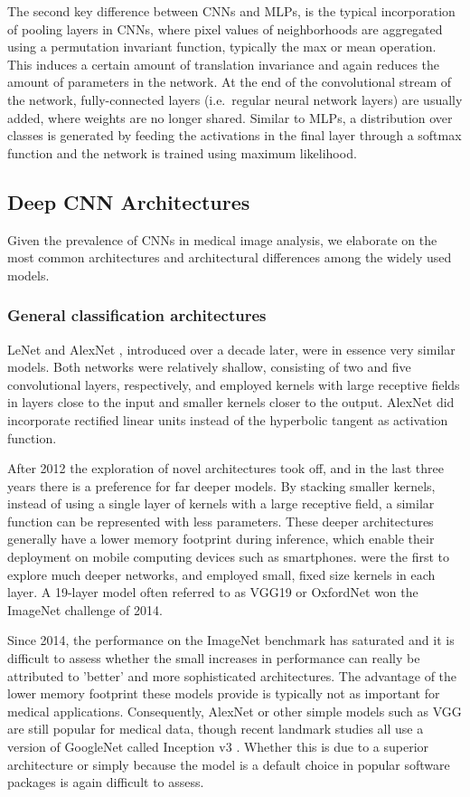 The second key difference between CNNs and MLPs, is the typical incorporation of pooling layers in CNNs, where pixel values of neighborhoods are aggregated using a permutation invariant function, typically the max or mean operation. This induces a certain amount of translation invariance and again reduces the amount of parameters in the network. At the end of the convolutional stream of the network, fully-connected layers (i.e.\ regular neural network layers) are usually added, where weights are no longer shared. Similar to MLPs, a distribution over classes is generated by feeding the activations in the final layer through a softmax function and the network is trained using maximum likelihood. 

\subsection{Deep CNN Architectures}
Given the prevalence of CNNs in medical image analysis, we elaborate on the most common architectures and architectural differences among the widely used models. 

\subsubsection{General classification architectures}
LeNet \cite{Lecu98} and AlexNet \cite{Kriz12}, introduced over a decade later, were in essence very similar models. Both networks were relatively shallow, consisting of two and five convolutional layers, respectively, and employed kernels with large receptive fields in layers close to the input and smaller kernels closer to the output. AlexNet did incorporate rectified linear units instead of the hyperbolic tangent as activation function.

After 2012 the exploration of novel architectures took off, and in the last three years there is a preference for far deeper models. By stacking smaller kernels, instead of using a single layer of kernels with a large receptive field, a similar function can be represented with less parameters. These deeper architectures generally have a lower memory footprint during inference, which enable their deployment on mobile computing devices such as smartphones. \cite{Simo14} were the first to explore much deeper networks, and employed small, fixed size kernels in each layer. A 19-layer model often referred to as VGG19 or OxfordNet won the ImageNet challenge of 2014. 

Since 2014, the performance on the ImageNet benchmark has saturated and it is difficult to assess whether the small increases in performance can really be attributed to 'better' and more sophisticated architectures. The advantage of the lower memory footprint these models provide is typically not as important for medical applications. Consequently, AlexNet or other simple models such as VGG are still popular for medical data, though recent landmark studies all use a version of GoogleNet called Inception v3 \cite{Guls16}. Whether this is due to a superior architecture or simply because the model is a default choice in popular software packages is again difficult to assess. 

